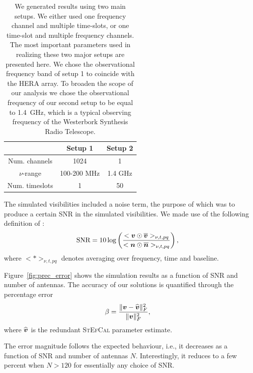 \documentclass[useAMS,usenatbib]{mn2e}
\newcommand{\bz}{\bmath{z}}
\newcommand{\bv}{\bmath{v}}
\newcommand{\bn}{\bmath{n}}
\newcommand{\bone}{\bmath{1}}
\newcommand{\conj}[1]{\overline{#1}}
\begin{document}
\begin{table}
\centering
\caption{We generated results using two main setups. We either used one frequency channel and multiple time-slots, or one time-slot and multiple frequency channels. The most important parameters used in realizing these two major setups are presented here. %
We chose the observational frequency band of setup 1 to coincide with the HERA array. To broaden the scope of our 
analysis we chose the observational frequency of our second setup to be equal to 1.4~GHz, which is a typical observing frequency of the Westerbork Synthesis Radio Telescope.}
\begin{tabular}{|c c c|} 
\hline
 & Setup 1 & Setup 2\\
\hline
\hline
 Num. channels & 1024 & 1\\
$\nu$-range & 100-200 MHz & 1.4 GHz\\
Num. timeslots & 1 & 50\\
\hline
\end{tabular}
\label{tab:ch_parm}
\end{table}

The simulated visibilities included a noise term, the purpose of which was to produce a certain SNR in the simulated
visibilities. We made use of the following definition of \citep[SNR, ][]{Liu2010,Marthi2014}:  
\begin{equation}
\label{}
\textrm{SNR} = 10\log \left (\frac{<\bv\odot\conj{\bv}>_{\nu,t,pq}}{<\bn\odot\conj{\bn}>_{\nu,t,pq}} \right ), 
\end{equation}
where $<*>_{\nu,t,pq}$ denotes averaging over frequency, time and baseline.

Figure~\ref{fig:prec_error} shows the simulation results as a function of SNR and number of antennas. The accuracy of our solutions is quantified through the percentage error
\begin{equation}
\label{eq:beta}
\beta = \frac{\|\bv - \widehat{\bv}\|_F^2}{\|\bv\|_F^2},
\end{equation}
where $\widehat{\bv}$ is the redundant \textsc{StEfCal} parameter estimate.

The error magnitude follows the expected behaviour, i.e., it decreases as a function of SNR and number of antennas $N$. Interestingly, it reduces to a few percent when $N > 120$ for essentially any choice of SNR. 
\end{document}
